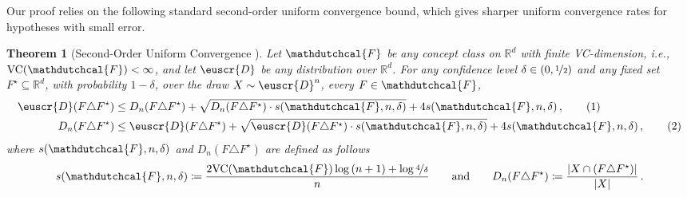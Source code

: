 \documentclass[11pt]{article}
\theoremstyle{plain}
\newtheorem{theorem}{Theorem}[section]
\theoremstyle{definition}
\theoremstyle{remark}
\newcommand{\yesnum}{\addtocounter{equation}{1}\tag{\theequation}}
\newcommand{\qquadtext}[1]{\qquad\text{#1}\qquad}
\newcommand{\qquadand}{\qquadtext{and}}
\def\abs#1{\left| #1 \right|}
\newcommand{\sinparen}[1]{(#1)}
\newcommand{\R}{\mathbb{R}}
\newcommand{\nfrac}[2]{\nicefrac{#1}{#2}}
\newcommand{\vc}{\textrm{\rm VC}}
\newcommand{\customcal}[1]{\euscr{#1}}
\newcommand{\cD}{\customcal{D}}
\newcommand{\ie}{\textit{i.e.}}
\newcommand{\hypo}[1]{\mathdutchcal{#1}}
\newcommand{\hyF}{\hypo{F}}
\begin{document}
    
    Our proof relies on the following standard second-order uniform convergence bound, which gives sharper uniform convergence rates for hypotheses with small error.
    \begin{theorem}[Second-Order Uniform Convergence ]
        \label{thm:unifConvergence}
        Let $\hyF$ be any concept class on $\R^d$ with finite VC-dimension, \ie{}, $\vc{(\hyF)}<\infty$, and let $\cD$ be any distribution over $\R^d$.
        For any confidence level $\delta\in (0,\nfrac{1}{2})$ and any fixed set $F^\star\subseteq \R^d$, with probability $1-\delta$, over the draw $X\sim \cD^n$, every $F\in \hyF$,
        \begin{align*}
            \cD\sinparen{F\triangle F^\star}
                &\leq 
                    D_n\sinparen{F\triangle F^\star}
                    + \sqrt{
                        D_n\sinparen{F\triangle F^\star}
                        \cdot 
                        s(\hyF,n,\delta)
                    }
                    + 
                    4 s(\hyF,n,\delta)\,,
                \yesnum\label{eq:sampleComplexity:1}\\
                D_n\sinparen{F\triangle F^\star}
                &\leq 
                    \cD\sinparen{F\triangle F^\star}
                    + \sqrt{
                        \cD\sinparen{F\triangle F^\star}
                        \cdot 
                        s(\hyF,n,\delta)
                    }
                    + 
                    4 s(\hyF,n,\delta)\,,
                \yesnum\label{eq:sampleComplexity:2}
        \end{align*}
        where $s(\hyF,n,\delta)$ and $D_n\sinparen{F\triangle F^\star}$ are defined as follows 
        \[
            s(\hyF,n,\delta) \coloneqq \frac{2\vc{(\hyF)}\log{(n+1)}+\log{\nfrac{4}{\delta}}}{n}
            \qquadand
            D_n\sinparen{F\triangle F^\star}
            \coloneqq 
            \frac{\abs{X\cap \sinparen{F\triangle F^\star}}}{\abs{X}}\,.
        \]
    \end{theorem}
\end{document}
